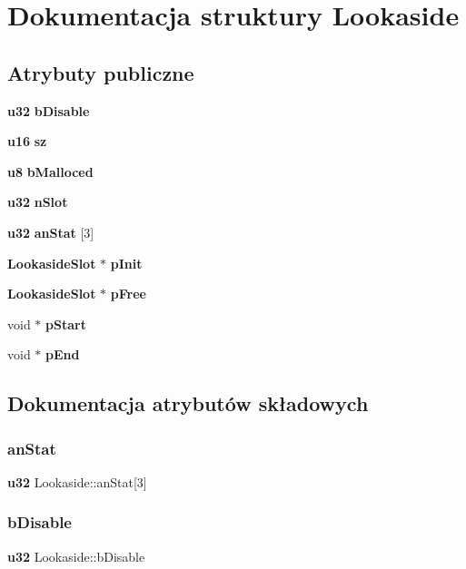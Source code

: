 \section{Dokumentacja struktury Lookaside}
\label{struct_lookaside}
\subsection*{Atrybuty publiczne}
\begin{DoxyCompactItemize}
\item 
\textbf{ u32} \textbf{ b\+Disable}
\item 
\textbf{ u16} \textbf{ sz}
\item 
\textbf{ u8} \textbf{ b\+Malloced}
\item 
\textbf{ u32} \textbf{ n\+Slot}
\item 
\textbf{ u32} \textbf{ an\+Stat} [3]
\item 
\textbf{ Lookaside\+Slot} $\ast$ \textbf{ p\+Init}
\item 
\textbf{ Lookaside\+Slot} $\ast$ \textbf{ p\+Free}
\item 
void $\ast$ \textbf{ p\+Start}
\item 
void $\ast$ \textbf{ p\+End}
\end{DoxyCompactItemize}


\subsection{Dokumentacja atrybutów składowych}
\mbox{\label{struct_lookaside_ad40d755aab79635a98a90fbe7fc698e8}} 
\subsubsection{anStat}
{\footnotesize\ttfamily \textbf{ u32} Lookaside\+::an\+Stat[3]}

\mbox{\label{struct_lookaside_ac81ee3b5b12d0bc89ed1286718224db1}} 
\subsubsection{bDisable}
{\footnotesize\ttfamily \textbf{ u32} Lookaside\+::b\+Disable}

\mbox{\label{struct_lookaside_a218f14cf9eb2c430867d286e9ac57ac5}} 
